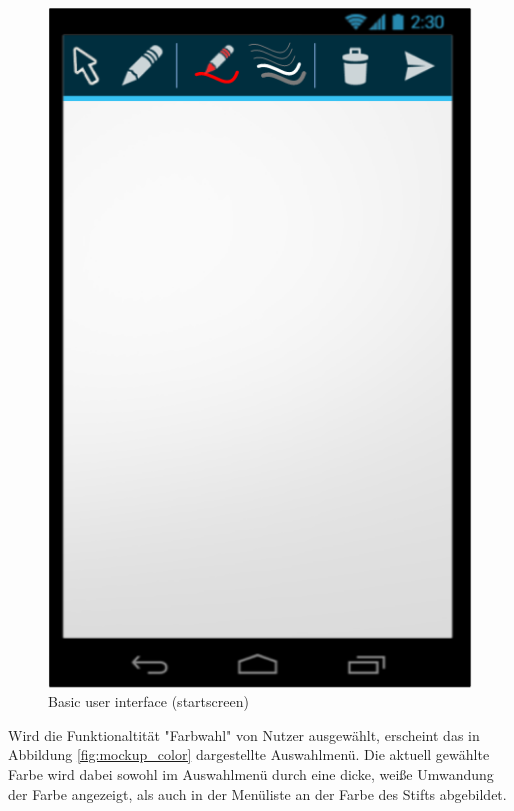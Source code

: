 \documentclass{chi-ext}
\begin{document}
\begin{figure}
  \centering
  \includegraphics[width=\linewidth]{img/android/mockup_startscreen.png}
  \caption{Basic user interface (startscreen)}
  \label{fig:mockup_startscreen}
\end{figure}

Wird die Funktionaltität "Farbwahl" von Nutzer ausgewählt, erscheint das in Abbildung \ref{fig:mockup_color} dargestellte Auswahlmenü. Die aktuell gewählte Farbe wird dabei sowohl im Auswahlmenü durch eine dicke, weiße Umwandung der Farbe angezeigt, als auch in der Menüliste an der Farbe des Stifts abgebildet.
\end{document}
